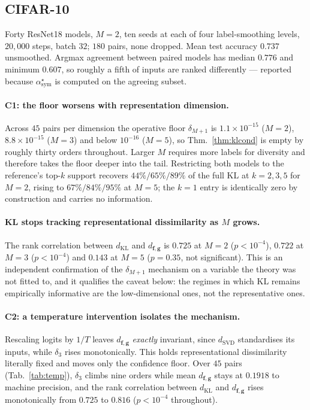 \documentclass[10pt,letterpaper,twocolumn]{article}
\newcommand{\bff}{\mathbf{f}}
\newcommand{\bfg}{\mathbf{g}}
\newcommand{\dKL}{d_{\mathrm{KL}}}
\newcommand{\dSVD}{d_{\mathrm{SVD}}}
\newcommand{\dfg}{d_{\bff,\bfg}}
\theoremstyle{plain}
\theoremstyle{definition}
\theoremstyle{remark}
\begin{document}
\subsection{CIFAR-10}
\label{sec:exp-cifar}

Forty ResNet18 models, $M=2$, ten seeds at each of four label-smoothing levels,
$20{,}000$ steps, batch $32$; $180$ pairs, none dropped. Mean test accuracy
$0.737$ unsmoothed. Argmax agreement between paired models has median $0.776$
and minimum $0.607$, so roughly a fifth of inputs are ranked differently ---
reported because $\alpha^{\star}_{\mathrm{sym}}$ is computed on the agreeing
subset.

\paragraph{C1: the floor worsens with representation dimension.}
Across $45$ pairs per dimension the operative floor $\delta_{M+1}$ is
$1.1\times10^{-15}$ ($M{=}2$), $8.8\times10^{-15}$ ($M{=}3$) and below
$10^{-16}$ ($M{=}5$), so Thm.~\ref{thm:klcond} is empty by roughly thirty
orders throughout. Larger $M$ requires more labels for diversity and therefore
takes the floor deeper into the tail. Restricting both models to the
reference's top-$k$ support recovers $44\%/65\%/89\%$ of the full KL at
$k=2,3,5$ for $M{=}2$, rising to $67\%/84\%/95\%$ at $M{=}5$; the $k=1$ entry
is identically zero by construction and carries no information.

\paragraph{KL stops tracking representational dissimilarity as $M$ grows.}
The rank correlation between $\dKL$ and $\dfg$ is $0.725$ at $M{=}2$
($p<10^{-4}$), $0.722$ at $M{=}3$ ($p<10^{-4}$) and $0.143$ at $M{=}5$
($p=0.35$, not significant). This is an independent confirmation of the
$\delta_{M+1}$ mechanism on a variable the theory was not fitted to, and it
qualifies the caveat below: the regimes in which KL remains empirically
informative are the low-dimensional ones, not the representative ones.

\paragraph{C2: a temperature intervention isolates the mechanism.}
Rescaling logits by $1/T$ leaves $\dfg$ \emph{exactly} invariant, since
$\dSVD$ standardises its inputs, while $\delta_{3}$ rises monotonically. This
holds representational dissimilarity literally fixed and moves only the
confidence floor. Over $45$ pairs (Tab.~\ref{tab:temp}), $\delta_{3}$ climbs
nine orders while mean $\dfg$ stays at $0.1918$ to machine precision, and the
rank correlation between $\dKL$ and $\dfg$ rises monotonically from $0.725$ to
$0.816$ ($p<10^{-4}$ throughout).
\end{document}
